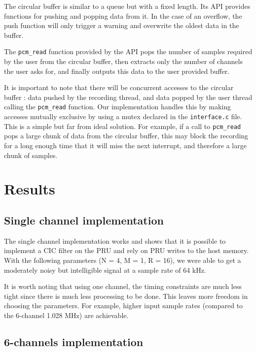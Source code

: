 \documentclass[]{report}
\begin{document}
The circular buffer is similar to a queue but with a fixed length. Its
API provides functions for pushing and popping data from it. In the case
of an overflow, the push function will only trigger a warning and
overwrite the oldest data in the buffer.

The \texttt{pcm\_read} function provided by the API pops the number of
samples required by the user from the circular buffer, then extracts
only the number of channels the user asks for, and finally outputs this
data to the user provided buffer.

It is important to note that there will be concurrent accesses to the
circular buffer : data pushed by the recording thread, and data popped
by the user thread calling the \texttt{pcm\_read} function. Our
implementation handles this by making accesses mutually exclusive by
using a mutex declared in the \texttt{interface.c} file. This is a
simple but far from ideal solution. For example, if a call to
\texttt{pcm\_read} pops a large chunk of data from the circular buffer,
this may block the recording for a long enough time that it will miss
the next interrupt, and therefore a large chunk of samples.

\hypertarget{results}{%
\chapter{Results}\label{results}}

\hypertarget{single-channel-implementation}{%
\section{Single channel
implementation}\label{single-channel-implementation}}

The single channel implementation works and shows that it is possible to
implement a CIC filter on the PRU and rely on PRU writes to the host
memory. With the following parameters (N = 4, M = 1, R = 16), we were
able to get a moderately noisy but intelligible signal at a sample rate
of 64 kHz.

It is worth noting that using one channel, the timing constraints are
much less tight since there is much less processing to be done. This
leaves more freedom in choosing the parameters. For example, higher
input sample rates (compared to the 6-channel 1.028 MHz) are achievable.

\hypertarget{channels-implementation}{%
\section{6-channels implementation}\label{channels-implementation}}
\end{document}
